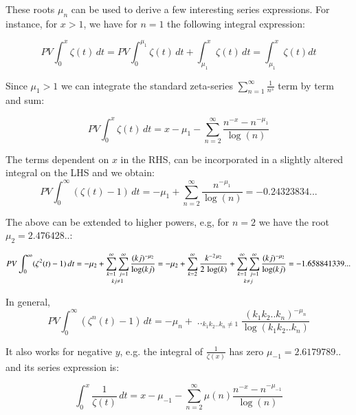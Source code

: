 \documentclass[a4paper,11pt,twoside]{amsart}
\begin{document}
These roots $\mu_{n}$ can be used to derive a few interesting series expressions. For instance, for $x > 1$, we have for $n = 1$ the following integral expression:

\begin{equation}\label{zetPV1}
 PV \int_0^x \zeta(t)\, dt = PV \int_0^{\mu_1} \zeta(t)\, dt + \int_{\mu_1}^{x} \zeta(t)\, dt = \int_{\mu_1}^{x} \zeta(t) dt
\end{equation}

Since $\mu_1 > 1$ we can integrate the standard zeta-series $\displaystyle \sum_{n=1}^{\infty} \frac{1}{n^s}$ term by term and sum:

\begin{equation}\label{zetPV2}
  PV \int_0^x \zeta(t)\, dt = x - \mu_1 - \sum_{n=2}^{\infty} \frac{n^{-x}-n^{-\mu_1}}{\log(n)}
\end{equation}

The terms dependent on $x$ in the RHS, can be incorporated in a slightly altered integral on the LHS and we obtain:
\begin{equation}\label{zetPV3}
  PV \int_0^{\infty} (\zeta(t) - 1) \,dt = -\mu_1+\sum_{n=2}^{\infty} \frac{n^{-\mu_1}}{\log(n)}=-0.24323834...
\end{equation}

The above can be extended to higher powers, e.g, for $n=2$ we have the root $\mu_{2} = 2.476428..$:

\begin{equation}\label{zetPV4}
 PV \int_0^{\infty} (\zeta^{2}(t) - 1) \,dt = -\mu_{2} + \mathop{\sum_{k=1}^{\infty}\sum_{j=1}^{\infty}}_{kj \ne 1} \frac{(kj)^{-\mu_{2}}}{\log(kj)}\\
= -\mu_{2}+\sum_{k=2}^{\infty} \frac{k^{-2\,\mu_{2}}}{2\,\log(k)} + \mathop{\sum_{k=1}^{\infty}\sum_{j=1}^{\infty}}_{k \ne j} \frac{(kj)^{-\mu_{2}}}{\log(kj)} = -1.658841339... 
\end{equation}

In general, 
\begin{equation}\label{zetPV5}
 PV \int_0^{\infty} (\zeta^{n}(t) - 1) \,dt = -\mu_{n} + \mathop{\sum_{k_{1}=1}^{\infty}\sum_{k_{2}=1}^{\infty}..\sum_{k_{n}=1}^{\infty}}_{k_{1}k_{2}..k_{n} \ne 1} \frac{(k_{1}k_{2}..k_{n})^{-\mu_{n}}}{\log(k_{1}k_{2}..k_{n})}
\end{equation}

It also works for negative $y$, e.g. the integral of $\frac{1}{\zeta(x)}$ has zero $\mu_{-1} = 2.6179789..$ and its series expression is:

\begin{equation}\label{zetPV6}
 \int_0^x \frac{1}{\zeta(t)}\, dt = x- \mu_{-1} - \sum_{n=2}^{\infty} \mu(n)\frac{n^{-x}-n^{-\mu_{-1}}}{\log(n)}
\end{equation}
\end{document}
